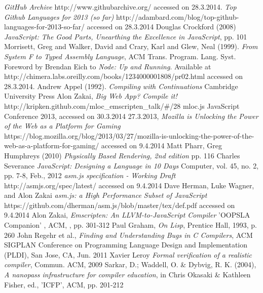 \documentclass[11pt]{report}
\begin{document}
\begin{thebibliography}{1}
     {\em GitHub Archive} http://www.githubarchive.org/ accessed on 28.3.2014.
     {\em Top Github Languages for 2013 (so far)} http://adambard.com/blog/top-github-languages-for-2013-so-far/ accessed on 28.3.2014
     Douglas Crockford (2008) {\em JavaScript: The Good Parts, Unearthing the Excellence in JavaScript}, pp. 101
     Morrisett, Greg and Walker, David and Crary, Karl and Glew, Neal (1999). {\em From System F to Typed Assembly Language}, ACM Trans. Program. Lang. Syst.
     Foreword by Brendan Eich to {\em Node: Up and Running}. Available at http://chimera.labs.oreilly.com/books/1234000001808/pr02.html accessed on 28.3.2014.
     Andrew Appel (1992). {\em Compiling with Continuations} Cambridge University Press
     Alon Zakai, {\em Big Web App? Compile it!} http://kripken.github.com/mloc_emscripten_talk/\#/28 mloc.js JavaScript Conference 2013, accessed on 30.3.2014
     27.3.2013, {\em Mozilla is Unlocking the Power of the Web as a Platform for Gaming} https://blog.mozilla.org/blog/2013/03/27/mozilla-is-unlocking-the-power-of-the-web-as-a-platform-for-gaming/ accessed on 9.4.2014
     Matt Pharr, Greg Humphreys (2010) {\em Physically Based Rendering, 2nd edition} pp. 116
     Charles Severance {\em JavaScript: Designing a Language in 10 Days} Computer, vol. 45, no. 2, pp. 7-8, Feb., 2012 
     {\em asm.js specification - Working Draft} http://asmjs.org/spec/latest/ accessed on 9.4.2014
     Dave Herman, Luke Wagner, and Alon Zakai {\em asm.js: a High Performance Subset of JavaScript} https://github.com/dherman/asm.js/blob/master/tex/def.pdf accessed on 9.4.2014
     Alon Zakai, {\em Emscripten: An LLVM-to-JavaScript Compiler} 'OOPSLA Companion' , ACM, , pp. 301-312
     Paul Graham, {\em On Lisp}, Prentice Hall, 1993, p. 260
     John Regehr et al., {\em Finding and Understanding Bugs in C Compilers}, ACM SIGPLAN Conference on Programming Language Design and Implementation (PLDI), San Jose, CA, Jun. 2011
     Xavier Leroy {\em Formal verification of a realistic compiler}, Commun. ACM, 2009
     Sarkar, D.; Waddell, O. \& Dybvig, R. K. (2004), {\em A nanopass infrastructure for compiler education}, in Chris Okasaki \& Kathleen Fisher, ed., 'ICFP', ACM, pp. 201-212

\end{thebibliography}
\end{document}
